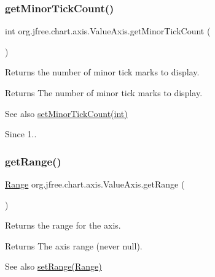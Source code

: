 \subsubsection{\texorpdfstring{get\+Minor\+Tick\+Count()}{getMinorTickCount()}}
{\footnotesize\ttfamily int org.\+jfree.\+chart.\+axis.\+Value\+Axis.\+get\+Minor\+Tick\+Count (\begin{DoxyParamCaption}{ }\end{DoxyParamCaption})}

Returns the number of minor tick marks to display.

\begin{DoxyReturn}{Returns}
The number of minor tick marks to display.
\end{DoxyReturn}
\begin{DoxySeeAlso}{See also}
\mbox{\hyperlink{classorg_1_1jfree_1_1chart_1_1axis_1_1_value_axis_a4c9475cb0828091509a36f19d300f84c}{set\+Minor\+Tick\+Count(int)}}
\end{DoxySeeAlso}
\begin{DoxySince}{Since}
1.. 
\end{DoxySince}
\mbox{\label{classorg_1_1jfree_1_1chart_1_1axis_1_1_value_axis_af52527fb8e81b79bdf0042eda7c7f138}} 
\subsubsection{\texorpdfstring{get\+Range()}{getRange()}}
{\footnotesize\ttfamily \mbox{\hyperlink{classorg_1_1jfree_1_1data_1_1_range}{Range}} org.\+jfree.\+chart.\+axis.\+Value\+Axis.\+get\+Range (\begin{DoxyParamCaption}{ }\end{DoxyParamCaption})}

Returns the range for the axis.

\begin{DoxyReturn}{Returns}
The axis range (never {\ttfamily null}).
\end{DoxyReturn}
\begin{DoxySeeAlso}{See also}
\mbox{\hyperlink{classorg_1_1jfree_1_1chart_1_1axis_1_1_value_axis_a917f68b11632931a40e57551164c181e}{set\+Range(\+Range)}} 
\end{DoxySeeAlso}
\mbox{\label{classorg_1_1jfree_1_1chart_1_1axis_1_1_value_axis_a5a1a077afd417597a208df17e1e6410f}} 
